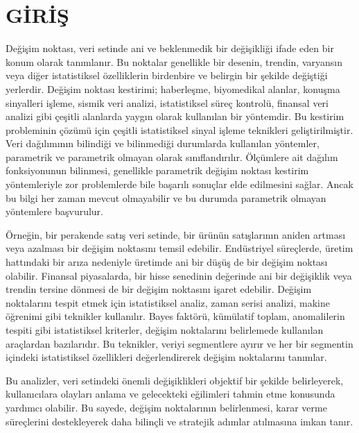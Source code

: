 \documentclass[12pt,twoside]{deuthesis}
\begin{document}
\mainmatter %
\pagestyle{fancyplain} %

\chapter*{GİRİŞ}\label{giriux15f}

Değişim noktası, veri setinde ani ve beklenmedik bir değişikliği ifade eden bir konum olarak tanımlanır. Bu noktalar genellikle bir desenin, trendin, varyansın veya diğer istatistiksel özelliklerin birdenbire ve belirgin bir şekilde değiştiği yerlerdir. Değişim noktası kestirimi; haberleşme, biyomedikal alanlar, konuşma sinyalleri işleme, sismik veri analizi, istatistiksel süreç kontrolü, finansal veri analizi gibi çeşitli alanlarda yaygın olarak kullanılan bir yöntemdir. Bu kestirim probleminin çözümü için çeşitli istatistiksel sinyal işleme teknikleri geliştirilmiştir. Veri dağılımının bilindiği ve bilinmediği durumlarda kullanılan yöntemler, parametrik ve parametrik olmayan olarak sınıflandırılır. Ölçümlere ait dağılım fonksiyonunun bilinmesi, genellikle parametrik değişim noktası kestirim yöntemleriyle zor problemlerde bile başarılı sonuçlar elde edilmesini sağlar. Ancak bu bilgi her zaman mevcut olmayabilir ve bu durumda parametrik olmayan yöntemlere başvurulur.

Örneğin, bir perakende satış veri setinde, bir ürünün satışlarının aniden artması veya azalması bir değişim noktasını temsil edebilir. Endüstriyel süreçlerde, üretim hattındaki bir arıza nedeniyle üretimde ani bir düşüş de bir değişim noktası olabilir. Finansal piyasalarda, bir hisse senedinin değerinde ani bir değişiklik veya trendin tersine dönmesi de bir değişim noktasını işaret edebilir. Değişim noktalarını tespit etmek için istatistiksel analiz, zaman serisi analizi, makine öğrenimi gibi teknikler kullanılır. Bayes faktörü, kümülatif toplam, anomalilerin tespiti gibi istatistiksel kriterler, değişim noktalarını belirlemede kullanılan araçlardan bazılarıdır. Bu teknikler, veriyi segmentlere ayırır ve her bir segmentin içindeki istatistiksel özellikleri değerlendirerek değişim noktalarını tanımlar.

Bu analizler, veri setindeki önemli değişiklikleri objektif bir şekilde belirleyerek, kullanıcılara olayları anlama ve gelecekteki eğilimleri tahmin etme konusunda yardımcı olabilir. Bu sayede, değişim noktalarının belirlenmesi, karar verme süreçlerini destekleyerek daha bilinçli ve stratejik adımlar atılmasına imkan tanır.
\end{document}
